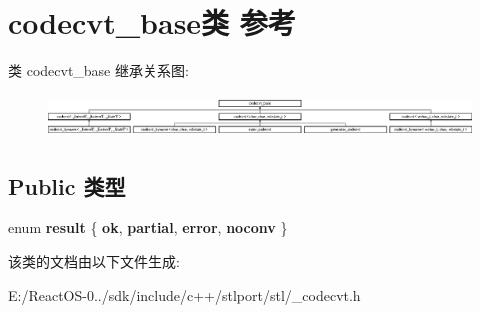 \hypertarget{classcodecvt__base}{}\section{codecvt\+\_\+base类 参考}
\label{classcodecvt__base}
类 codecvt\+\_\+base 继承关系图\+:\begin{figure}[H]
\begin{center}
\leavevmode
\includegraphics[height=1.135135cm]{classcodecvt__base}
\end{center}
\end{figure}
\subsection*{Public 类型}
\begin{DoxyCompactItemize}
\item 
\mbox{\label{classcodecvt__base_a409adab7523549c6168801720cd42386}} 
enum {\bfseries result} \{ {\bfseries ok}, 
{\bfseries partial}, 
{\bfseries error}, 
{\bfseries noconv}
 \}
\end{DoxyCompactItemize}


该类的文档由以下文件生成\+:\begin{DoxyCompactItemize}
\item 
E\+:/\+React\+O\+S-\/0../sdk/include/c++/stlport/stl/\+\_\+codecvt.\+h\end{DoxyCompactItemize}

